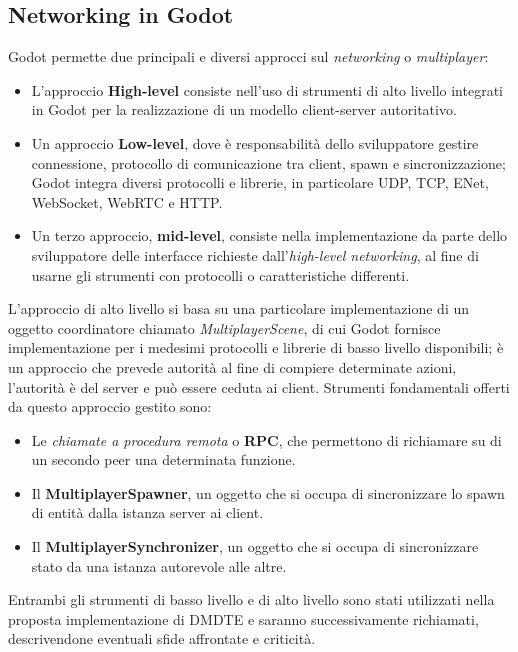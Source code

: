 \subsection{Networking in Godot}
Godot permette due principali e diversi approcci \cite{GodotMultiplayerDocs} sul \textit{networking} o \textit{multiplayer}:
\begin{itemize}
	\item L'approccio \textbf{High-level} consiste nell'uso di strumenti di alto livello integrati in Godot per la realizzazione di un modello client-server autoritativo.
	\item Un approccio \textbf{Low-level}, dove è responsabilità dello sviluppatore gestire connessione, protocollo di comunicazione tra client, spawn e sincronizzazione; Godot integra diversi protocolli e librerie, in particolare UDP, TCP, ENet, WebSocket, WebRTC e HTTP.
	\item Un terzo approccio, \textbf{mid-level}, consiste nella implementazione da parte dello sviluppatore delle interfacce richieste dall'\textit{high-level networking}, al fine di usarne gli strumenti con protocolli o caratteristiche differenti.
\end{itemize}
\medbreak

L'approccio di alto livello si basa su una particolare implementazione di un oggetto coordinatore chiamato \textit{MultiplayerScene}, di cui Godot fornisce implementazione per i medesimi protocolli e librerie di basso livello disponibili; è un approccio che prevede autorità al fine di compiere determinate azioni, l'autorità è del server e può essere ceduta ai client.
\smallbreak
Strumenti fondamentali offerti da questo approccio gestito sono:
\begin{itemize}
	\item Le \textit{chiamate a procedura remota} o \textbf{RPC}, che permettono di richiamare su di un secondo peer una determinata funzione.
	\item Il \textbf{MultiplayerSpawner}, un oggetto che si occupa di sincronizzare lo spawn di entità dalla istanza server ai client.
	\item Il \textbf{MultiplayerSynchronizer}, un oggetto che si occupa di sincronizzare stato da una istanza autorevole alle altre.
\end{itemize}

Entrambi gli strumenti di basso livello e di alto livello sono stati utilizzati nella proposta implementazione di DMDTE e saranno successivamente richiamati, descrivendone eventuali sfide affrontate e criticità.

